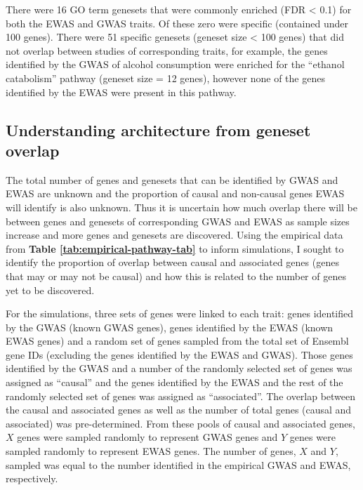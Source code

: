 \documentclass[11pt,twoside]{bristolthesis}
\begin{document}
There were 16 GO term genesets that were commonly enriched (FDR \textless{} 0.1) for both the EWAS and GWAS traits. Of these zero were specific (contained under 100 genes). There were 51 specific genesets (geneset size \textless{} 100 genes) that did not overlap between studies of corresponding traits, for example, the genes identified by the GWAS of alcohol consumption were enriched for the ``ethanol catabolism'' pathway (geneset size = 12 genes), however none of the genes identified by the EWAS were present in this pathway.

\hypertarget{architecture-sims}{%
\subsection{Understanding architecture from geneset overlap}\label{architecture-sims}}

The total number of genes and genesets that can be identified by GWAS and EWAS are unknown and the proportion of causal and non-causal genes EWAS will identify is also unknown. Thus it is uncertain how much overlap there will be between genes and genesets of corresponding GWAS and EWAS as sample sizes increase and more genes and genesets are discovered. Using the empirical data from \textbf{Table \ref{tab:empirical-pathway-tab}} to inform simulations, I sought to identify the proportion of overlap between causal and associated genes (genes that may or may not be causal) and how this is related to the number of genes yet to be discovered.

For the simulations, three sets of genes were linked to each trait: genes identified by the GWAS (known GWAS genes), genes identified by the EWAS (known EWAS genes) and a random set of genes sampled from the total set of Ensembl gene IDs (excluding the genes identified by the EWAS and GWAS). Those genes identified by the GWAS and a number of the randomly selected set of genes was assigned as ``causal'' and the genes identified by the EWAS and the rest of the randomly selected set of genes was assigned as ``associated''. The overlap between the causal and associated genes as well as the number of total genes (causal and associated) was pre-determined. From these pools of causal and associated genes, \(X\) genes were sampled randomly to represent GWAS genes and \(Y\) genes were sampled randomly to represent EWAS genes. The number of genes, \(X\) and \(Y\), sampled was equal to the number identified in the empirical GWAS and EWAS, respectively.
\end{document}
